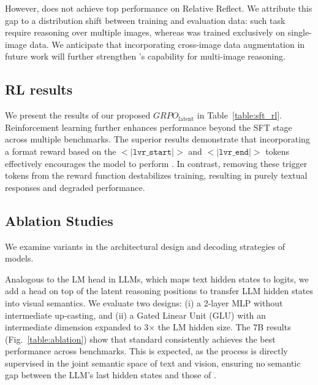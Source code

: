 However, \modelname does not achieve top performance on Relative Reflect. We attribute this gap to a distribution shift between training and evaluation data: such task require reasoning over multiple images, whereas \modelname was trained exclusively on single-image data. We anticipate that incorporating cross-image data augmentation in future work will further strengthen \modelname’s capability for multi-image reasoning.

\subsection{RL results}
We present the results of our proposed $GRPO_{\text{latent}}$ in Table~\ref{table:sft_rl}. Reinforcement learning further enhances \modelname performance beyond the SFT stage across multiple benchmarks. The superior results demonstrate that incorporating a format reward based on the $<\vert\texttt{lvr\_start}\vert>$ and $<\vert\texttt{lvr\_end}\vert>$ tokens effectively encourages the model to perform \modelfullname. In contrast, removing these trigger tokens from the reward function destabilizes training, resulting in purely textual responses and degraded performance.

\subsection{Ablation Studies}\label{ssec:exp_ablation}
We examine variants in the architectural design and decoding strategies of \modelname models. 

Analogous to the LM head in LLMs, which maps text hidden states to logits, we add a \modelname head on top of the latent reasoning positions to transfer LLM hidden states into visual semantics. We evaluate two designs: (i) a 2-layer MLP without intermediate up-casting, and (ii) a Gated Linear Unit (GLU) with an intermediate dimension expanded to 3$\times$ the LM hidden size. The 7B results (Fig.~\ref{table:ablation}) show that standard \textbf{\modelname} consistently achieves the best performance across benchmarks. This is expected, as the \modelname process is directly supervised in the joint semantic space of text and vision, ensuring no semantic gap between the LLM’s last hidden states and those of \modelname.

